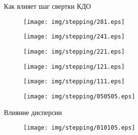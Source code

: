 \documentclass{beamer}
\begin{document}
\begin{frame}{Как влияет шаг свертки КДО}

\begin{figure}
\begin{minipage}[t]{.33\textwidth}
\centering
   \texttt{[image: img/stepping/281.eps]} \\
   {\scriptstyle{}}
\end{minipage}\hfill
\begin{minipage}[t]{.33\textwidth}
\centering
   \texttt{[image: img/stepping/241.eps]} \\
   {\scriptstyle{}}
\end{minipage}\hfill
\begin{minipage}[t]{.33\textwidth}
\centering
   \texttt{[image: img/stepping/221.eps]} \\
	{\scriptstyle{}}

\end{minipage}

\begin{minipage}[t]{.33\textwidth}
\centering
   \texttt{[image: img/stepping/121.eps]} \\
	{\scriptstyle{}}
\end{minipage}\hfill
\begin{minipage}[t]{.33\textwidth}
\centering
   \texttt{[image: img/stepping/111.eps]} \\
{\scriptstyle{}}
\end{minipage}\hfill
\begin{minipage}[t]{.33\textwidth}
\centering
   \texttt{[image: img/stepping/050505.eps]} \\
{\scriptstyle{}}
\end{minipage}
\end{figure}
\end{frame}



\begin{frame}{Влияние дисперсии}
  \begin{figure}
\texttt{[image: img/stepping/010105.eps]}\\
{\scriptstyle{}}
\end{figure}
\end{frame}
\end{document}

